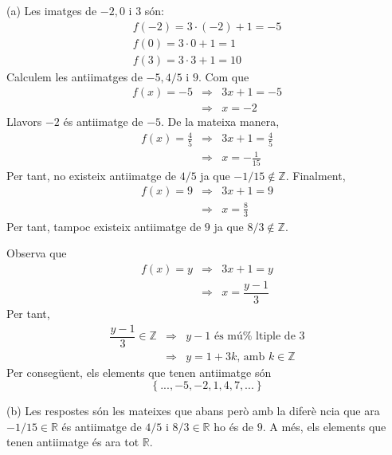 \begin{solucio}
(a) Les imatges de $-2,0$ i $3$ s\'{o}n:%
\begin{equation*}
\begin{array}{l}
f(-2)=3\cdot \left( -2\right) +1=-5 \\
f(0)=3\cdot 0+1=1 \\
f(3)=3\cdot 3+1=10%
\end{array}%
\end{equation*}%
Calculem les antiimatges de $-5,4/5$ i $9$. Com que%
\begin{equation*}
\begin{array}{lll}
f(x)=-5 & \Longrightarrow & 3x+1=-5 \\
& \Longrightarrow & x=-2%
\end{array}%
\end{equation*}%
Llavors $-2$ \'{e}s antiimatge de $-5$. De la mateixa manera,
\begin{equation*}
\begin{array}{lll}
f(x)=\frac{4}{5} & \Longrightarrow & 3x+1=\frac{4}{5} \\
& \Longrightarrow & x=-\frac{1}{15}%
\end{array}%
\end{equation*}%
Per tant, no existeix antiimatge de $4/5$ ja que $-1/15\notin \mathbb{Z}$.
Finalment,%
\begin{equation*}
\begin{array}{lll}
f(x)=9 & \Longrightarrow & 3x+1=9 \\
& \Longrightarrow & x=\frac{8}{3}%
\end{array}%
\end{equation*}%
Per tant, tampoc existeix antiimatge de $9$ ja que $8/3\notin \mathbb{Z}$.

Observa que%
\begin{equation*}
\begin{array}{lll}
f(x)=y & \Longrightarrow & 3x+1=y \\
& \Longrightarrow & x=\dfrac{y-1}{3}%
\end{array}%
\end{equation*}%
Per tant,%
\begin{equation*}
\begin{array}{lll}
\dfrac{y-1}{3}\in \mathbb{Z} & \Longrightarrow & y-1\text{ \'{e}s m\'{u}%
ltiple de }3 \\
& \Longrightarrow & y=1+3k\text{, amb }k\in \mathbb{Z}%
\end{array}%
\end{equation*}%
Per conseg\"{u}ent, els elements que tenen antiimatge s\'{o}n%
\begin{equation*}
\left\{ ...,-5,-2,1,4,7,...\right\}
\end{equation*}

(b) Les respostes s\'{o}n les mateixes que abans per\`{o} amb la difer\`{e}%
ncia que ara $-1/15\in \mathbb{R}$ \'{e}s antiimatge de $4/5$ i $8/3\in
\mathbb{R}$ ho \'{e}s de $9$. A m\'{e}s, els elements que tenen antiimatge
\'{e}s ara tot $\mathbb{R}$.
\end{solucio}

